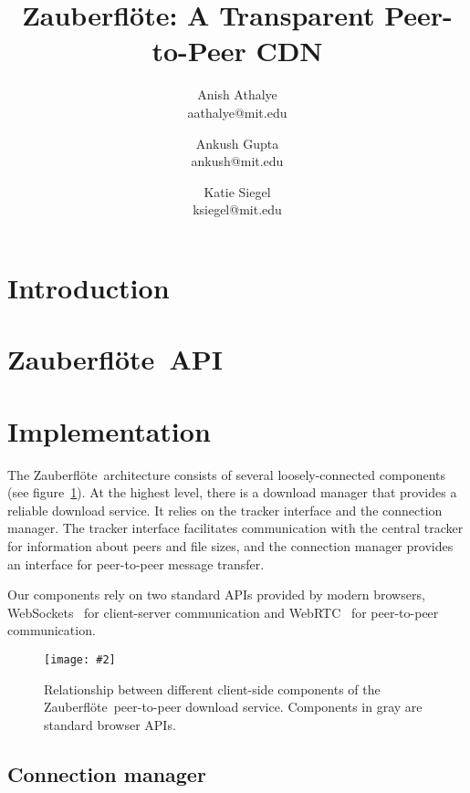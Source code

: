 \documentclass[letterpaper,twocolumn,10pt]{article}
\newcommand{\zbf}{Zauberfl\"{o}te}
\newcommand{\projtitle}{\zbf: A Transparent Peer-to-Peer CDN}
\newcommand{\inclfigure}[3]{
    \begin{figure}
        \begin{centering}
            \texttt{[image: \#2]}
            \caption{#3}
            \label{#1}
        \end{centering}
    \end{figure}
}
\begin{document}
\title{\Large \bf \projtitle}

\author{
    {\rm Anish Athalye}\\
    aathalye@mit.edu
    \and
    {\rm Ankush Gupta}\\
    ankush@mit.edu
    \and
    {\rm Katie Siegel}\\
    ksiegel@mit.edu
}

\maketitle
\thispagestyle{empty}

\begin{abstract}

\end{abstract}

\section{Introduction}


\section{\zbf\ API}


\section{Implementation}

The \zbf\ architecture consists of several loosely-connected components (see
figure~\ref{fig:components}). At the highest level, there is a download manager that
provides a reliable download service. It relies on the tracker interface and
the connection manager. The tracker interface facilitates communication with
the central tracker for information about peers and file sizes, and the
connection manager provides an interface for peer-to-peer message transfer.

Our components rely on two standard APIs provided by modern browsers,
WebSockets~\cite{w3c:websocket} for client-server communication and
WebRTC~\cite{w3c:webrtc} for peer-to-peer communication.

\inclfigure{fig:components}{components.eps}{
    Relationship between different client-side components of the \zbf\
    peer-to-peer download service. Components in gray are standard browser
    APIs.
}

\subsection{Connection manager}
\end{document}
